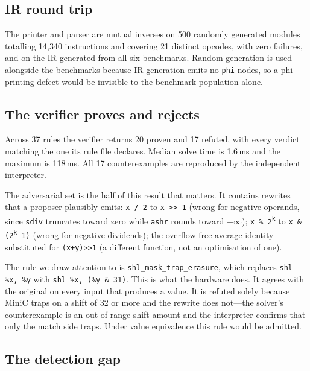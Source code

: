 \documentclass[conference]{IEEEtran}
\begin{document}
\subsection{IR round trip}

The printer and parser are mutual inverses on 500 randomly generated modules
totalling 14{,}340 instructions and covering 21 distinct opcodes, with zero
failures, and on the IR generated from all six benchmarks. Random generation is
used alongside the benchmarks because IR generation emits no \texttt{phi}
nodes, so a phi-printing defect would be invisible to the benchmark population
alone.

\subsection{The verifier proves and rejects}
\label{sec:verifier-results}

Across 37 rules the verifier returns 20 proven and 17 refuted, with every
verdict matching the one its rule file declares. Median solve time is 1.6\,ms
and the maximum is 118\,ms. All 17 counterexamples are reproduced by the
independent interpreter.

The adversarial set is the half of this result that matters. It contains
rewrites that a proposer plausibly emits: \texttt{x / 2} to \texttt{x >> 1}
(wrong for negative operands, since \texttt{sdiv} truncates toward zero while
\texttt{ashr} rounds toward $-\infty$); \texttt{x \% 2\textsuperscript{k}} to
\texttt{x \& (2\textsuperscript{k}-1)} (wrong for negative dividends); the
overflow-free average identity substituted for \texttt{(x+y)>>1} (a different
function, not an optimisation of one).

The rule we draw attention to is
\texttt{shl\_\allowbreak{}mask\_\allowbreak{}trap\_\allowbreak{}erasure},
which replaces \texttt{shl \%x, \%y} with \texttt{shl \%x, (\%y \& 31)}. This is what
the hardware does. It agrees with the original on every input that produces a
value. It is refuted solely because MiniC traps on a shift of 32 or more and
the rewrite does not---the solver's counterexample is an out-of-range shift
amount and the interpreter confirms that only the match side traps. Under value
equivalence this rule would be admitted.

\subsection{The detection gap}
\end{document}
